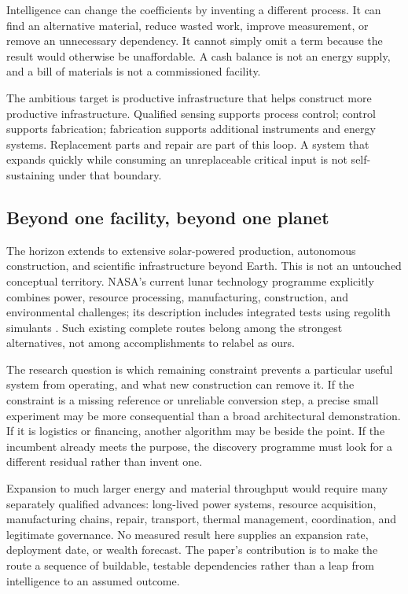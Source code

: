 Intelligence can change the coefficients by inventing a different process. It can find an alternative material, reduce wasted work, improve measurement, or remove an unnecessary dependency. It cannot simply omit a term because the result would otherwise be unaffordable. A cash balance is not an energy supply, and a bill of materials is not a commissioned facility.

The ambitious target is productive infrastructure that helps construct more productive infrastructure. Qualified sensing supports process control; control supports fabrication; fabrication supports additional instruments and energy systems. Replacement parts and repair are part of this loop. A system that expands quickly while consuming an unreplaceable critical input is not self-sustaining under that boundary.

\subsection{Beyond one facility, beyond one planet}

The horizon extends to extensive solar-powered production, autonomous construction, and scientific infrastructure beyond Earth. This is not an untouched conceptual territory. NASA's current lunar technology programme explicitly combines power, resource processing, manufacturing, construction, and environmental challenges; its description includes integrated tests using regolith simulants \citep{nasa2026}. Such existing complete routes belong among the strongest alternatives, not among accomplishments to relabel as ours.

The research question is which remaining constraint prevents a particular useful system from operating, and what new construction can remove it. If the constraint is a missing reference or unreliable conversion step, a precise small experiment may be more consequential than a broad architectural demonstration. If it is logistics or financing, another algorithm may be beside the point. If the incumbent already meets the purpose, the discovery programme must look for a different residual rather than invent one.

Expansion to much larger energy and material throughput would require many separately qualified advances: long-lived power systems, resource acquisition, manufacturing chains, repair, transport, thermal management, coordination, and legitimate governance. No measured result here supplies an expansion rate, deployment date, or wealth forecast. The paper's contribution is to make the route a sequence of buildable, testable dependencies rather than a leap from intelligence to an assumed outcome.

